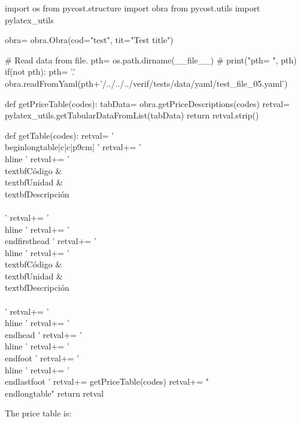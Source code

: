 \documentclass[11pt]{article}%
\begin{document}
 
 
 
\begin{pycode} 
 
import os
from pycost.structure import obra
from pycost.utils import pylatex_utils

obra= obra.Obra(cod="test", tit="Test title")

# Read data from file.
pth= os.path.dirname(__file__)
# print("pth= ", pth)
if(not pth):
    pth= '.'
obra.readFromYaml(pth+'/../../../verif/tests/data/yaml/test_file_05.yaml')

def getPriceTable(codes):
    tabData= obra.getPriceDescriptions(codes)
    retval= pylatex_utils.getTabularDataFromList(tabData)
    return retval.strip()

def getTable(codes):
    retval= '\\begin{longtable}{|c|c|p{9cm}|} \n'
    retval+= '\\hline \n'
    retval+= '\\textbf{Código} & \\textbf{Unidad} & \\textbf{Descripción} \\\\ \n'
    retval+= '\\hline \n'
    retval+= '\\endfirsthead \n'
    retval+= '\\hline \n'
    retval+= '\\textbf{Código} & \\textbf{Unidad} & \\textbf{Descripción} \\\\ \n'
    retval+= '\\hline \n'
    retval+= '\\endhead \n'
    retval+= '\\hline \n'
    retval+= '\\endfoot \n'
    retval+= '\\hline \n'
    retval+= '\\endlastfoot \n'
    retval+= getPriceTable(codes)
    retval+= "\\end{longtable}\n"
    return retval
    
        
\end{pycode}
 
The price table is:

\begin{center}
\begin{small}
\end{small}
\end{center}

\lipsum
\end{document}
